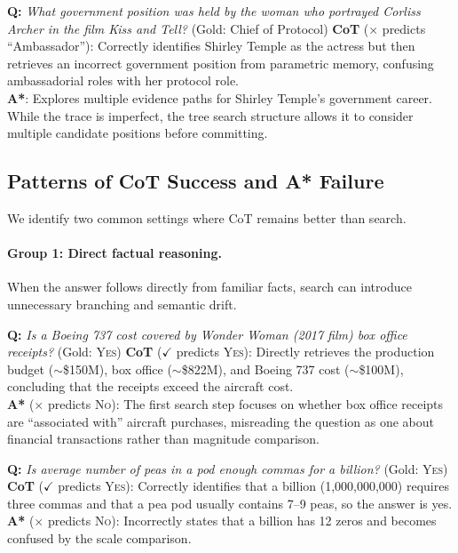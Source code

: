 \documentclass[11pt]{article}
\begin{document}
\begin{examplebox}[title=HotpotQA --- Multi-hop Chaining]
\textbf{Q:} \emph{What government position was held by the woman who portrayed Corliss Archer in the film \textit{Kiss and Tell}?} \quad (Gold: Chief of Protocol)
\tcblower
\textbf{CoT} ($\times$ predicts ``Ambassador''): Correctly identifies Shirley Temple as the actress but then retrieves an incorrect government position from parametric memory, confusing ambassadorial roles with her protocol role.\\[4pt]
\textbf{A*}: Explores multiple evidence paths for Shirley Temple's government career. While the trace is imperfect, the tree search structure allows it to consider multiple candidate positions before committing.
\end{examplebox}

\subsection{Patterns of CoT Success and A* Failure}
\label{app:cot_success}

We identify two common settings where CoT remains better than search.

\paragraph{Group 1: Direct factual reasoning.}
When the answer follows directly from familiar facts, search can introduce unnecessary branching and semantic drift.

\begin{examplebox}[title=StrategyQA --- Direct Factual Reasoning]
\textbf{Q:} \emph{Is a Boeing 737 cost covered by \textit{Wonder Woman} (2017 film) box office receipts?} \quad (Gold: \textsc{Yes})
\tcblower
\textbf{CoT} ($\checkmark$ predicts \textsc{Yes}): Directly retrieves the production budget ($\sim$\$150M), box office ($\sim$\$822M), and Boeing 737 cost ($\sim$\$100M), concluding that the receipts exceed the aircraft cost.\\[4pt]
\textbf{A*} ($\times$ predicts \textsc{No}): The first search step focuses on whether box office receipts are ``associated with'' aircraft purchases, misreading the question as one about financial transactions rather than magnitude comparison.
\end{examplebox}

\begin{examplebox}[title=StrategyQA --- Direct Factual Reasoning]
\textbf{Q:} \emph{Is average number of peas in a pod enough commas for a billion?} \quad (Gold: \textsc{Yes})
\tcblower
\textbf{CoT} ($\checkmark$ predicts \textsc{Yes}): Correctly identifies that a billion (1,000,000,000) requires three commas and that a pea pod usually contains 7--9 peas, so the answer is yes.\\[4pt]
\textbf{A*} ($\times$ predicts \textsc{No}): Incorrectly states that a billion has 12 zeros and becomes confused by the scale comparison.
\end{examplebox}
\end{document}
